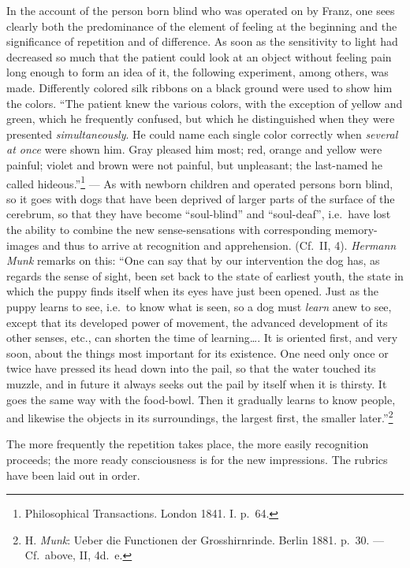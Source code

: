 \documentclass[12pt,a4paper]{book}
\newcommand{\opage}[1]{\marginnote{\footnotesize\textit{[#1]}}}
\begin{document}
In the account of the person born blind who was operated on by Franz, one
sees clearly both the predominance of the element of feeling at the
beginning and the significance of repetition and of difference. As soon as
the sensitivity to light had decreased so much that the patient could
look at an object without feeling pain long enough to form an idea of it,
the following experiment, among others, was made. Differently colored silk
ribbons on a black ground were used to show him the colors. ``The patient
knew the various colors, with the exception of yellow and green, which he
frequently confused, but which he distinguished when they were presented
\emph{simultaneously}. He could name each single color correctly when
\emph{several at once} were shown him. Gray pleased him most; red, orange
and yellow were painful; violet and brown were not painful, but
unpleasant; the
last-named he called hideous.''\footnote{Philosophical Transactions.
London 1841. I. p.~64.} --- As with newborn children and operated persons
born blind, so it goes with dogs that have been deprived of larger parts
of the surface of the cerebrum, so that they have become ``soul-blind''
and ``soul-deaf'', i.e.\ have lost the ability
\opage{153}to combine the new sense-sensations with corresponding
memory-images and thus to arrive at recognition and apprehension. (Cf.\
II, 4). \emph{Hermann Munk} remarks on this: ``One can say that by our
intervention the dog has, as regards the sense of sight, been set back to
the state of earliest youth, the state in which the puppy finds itself
when its eyes have just been opened. Just as the puppy learns to see,
i.e.\ to know what is seen, so a dog must \emph{learn} anew to see, except
that its developed power of movement, the advanced development of its
other senses, etc., can shorten the time of learning\ldots. It is
oriented first, and very soon, about the things most important for its
existence. One need only once or twice have pressed its head down into
the pail, so that the water touched its muzzle, and in future it always
seeks out the pail by itself when it is thirsty. It goes the same way with
the food-bowl. Then it gradually learns to know people, and likewise the
objects in its surroundings, the largest first, the smaller
later.''\footnote{H. \emph{Munk}: Ueber die Functionen der
Grosshirnrinde. Berlin 1881. p.~30. --- Cf.\ above, II, 4d.~e.}

The more frequently the repetition takes place, the more easily
recognition proceeds; the more ready consciousness is for the new
impressions. The rubrics have been laid out in order.
\end{document}
